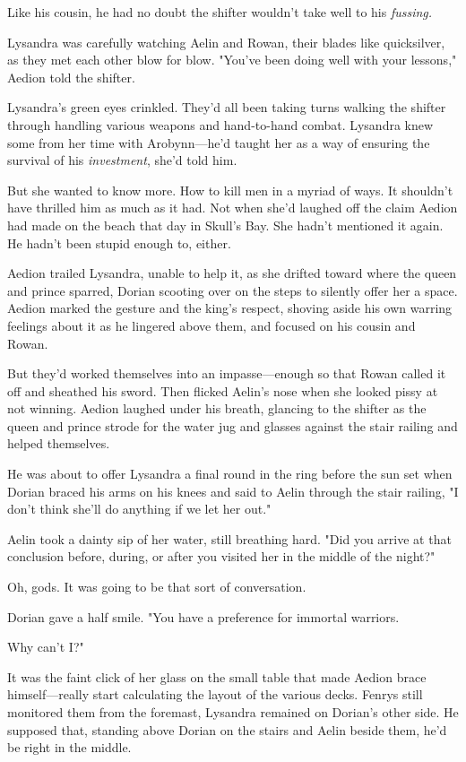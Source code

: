 Like his cousin, he had no doubt the shifter wouldn't take well to his \emph{fussing.}

Lysandra was carefully watching Aelin and Rowan, their blades like quicksilver, as they met each other blow for blow.
"You've been doing well with your lessons," Aedion told the shifter.

Lysandra's green eyes crinkled.
They'd all been taking turns walking the shifter through handling various weapons and hand-to-hand combat.
Lysandra knew some from her time with Arobynn---he'd taught her as a way of ensuring the survival of his \emph{investment}, she'd told him.

But she wanted to know more.
How to kill men in a myriad of ways.
It shouldn't have thrilled him as much as it had.
Not when she'd laughed off the claim Aedion had made on the beach that day in Skull's Bay.
She hadn't mentioned it again.
He hadn't been stupid enough to, either.

Aedion trailed Lysandra, unable to help it, as she drifted toward where the queen and prince sparred, Dorian scooting over on the steps to silently offer her a space.
Aedion marked the gesture and the king's respect, shoving aside his own warring feelings about it as he lingered above them, and focused on his cousin and Rowan.

But they'd worked themselves into an impasse---enough so that Rowan called it off and sheathed his sword.
Then flicked Aelin's nose when she looked pissy at not winning.
Aedion laughed under his breath, glancing to the shifter as the queen and prince strode for the water jug and glasses against the stair railing and helped themselves.

He was about to offer Lysandra a final round in the ring before the sun set when Dorian braced his arms on his knees and said to Aelin through the stair railing, "I don't think she'll do anything if we let her out."

Aelin took a dainty sip of her water, still breathing hard.
"Did you arrive at that conclusion before, during, or after you visited her in the middle of the night?"

Oh, gods.
It was going to be that sort of conversation.

Dorian gave a half smile.
"You have a preference for immortal warriors.

Why can't I?"

It was the faint click of her glass on the small table that made Aedion brace himself---really start calculating the layout of the various decks.
Fenrys still monitored them from the foremast, Lysandra remained on Dorian's other side.
He supposed that, standing above Dorian on the stairs and Aelin beside them, he'd be right in the middle.

